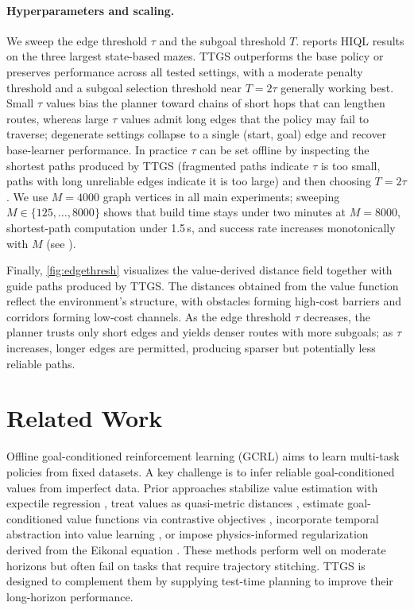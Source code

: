 \documentclass{article} %
\begin{document}
\paragraph{Hyperparameters and scaling.}\label{subsec:hyperparams}
We sweep the edge threshold $\tau$ and the subgoal threshold $T$.  reports HIQL results on the three largest state-based mazes. TTGS outperforms the base policy or preserves performance across all tested settings, with a moderate penalty threshold and a subgoal selection threshold near $T = 2\tau$ generally working best. Small $\tau$ values bias the planner toward chains of short hops that can lengthen routes, whereas large $\tau$ values admit long edges that the policy may fail to traverse; degenerate settings collapse to a single (start, goal) edge and recover base-learner performance. In practice $\tau$ can be set offline by inspecting the shortest paths produced by TTGS (fragmented paths indicate $\tau$ is too small, paths with long unreliable edges indicate it is too large) and then choosing $T = 2\tau$. We use $M{=}4000$ graph vertices in all main experiments; sweeping $M\in\{125,\ldots,8000\}$ shows that build time stays under two minutes at $M{=}8000$, shortest-path computation under 1.5\,s, and success rate increases monotonically with $M$ (see ).

Finally, \autoref{fig:edgethresh} visualizes the value-derived distance field together with guide paths produced by TTGS. The distances obtained from the value function reflect the environment’s structure, with obstacles forming high-cost barriers and corridors forming low-cost channels. As the edge threshold $\tau$ decreases, the planner trusts only short edges and yields denser routes with more subgoals; as $\tau$ increases, longer edges are permitted, producing sparser but potentially less reliable paths.


\section{Related Work}
Offline goal-conditioned reinforcement learning (GCRL) aims to learn multi-task policies from fixed datasets. A key challenge is to infer reliable goal-conditioned values from imperfect data. Prior approaches stabilize value estimation with expectile regression \citep{Kostrikov2022, park2024hiqlofflinegoalconditionedrl}, treat values as quasi-metric distances \citep{tongzhouw2023qrl}, estimate goal-conditioned value functions via contrastive objectives \citep{Eysenbach2022, Zheng2024}, incorporate temporal abstraction into value learning \citep{ota2025}, or impose physics-informed regularization derived from the Eikonal equation \citep{giammarino2025physicsinformed}. These methods perform well on moderate horizons but often fail on tasks that require trajectory stitching. TTGS is designed to complement them by supplying test-time planning to improve their long-horizon performance.
\end{document}
